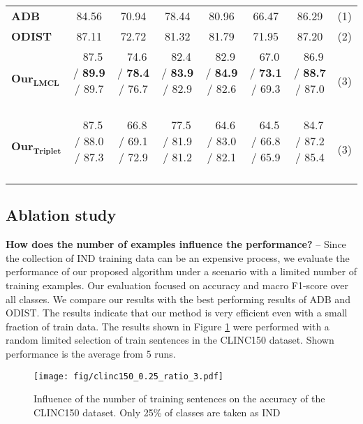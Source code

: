 \documentclass[runningheads]{llncs}
\begin{document}
\begin{table}[t]
\begin{adjustbox}{width=1\textwidth}
\begin{tabular}{l|cc|cc|cc|c}
\textbf{ADB}                & 84.56                & 70.94                & 78.44                & 80.96                & 66.47                & 86.29                & (1)  \\
\textbf{ODIST}              & 87.11                & 72.72                & 81.32       & 81.79                & 71.95       & 87.20                & (2)  \\ \hline
$\mathbf{Our}_\mathbf{LMCL}$    & \,\, 87.5 /  \textbf{89.9} /  89.7 \,\, & \,\, 74.6 /  \textbf{78.4} /  76.7 \,\, & \,\, 82.4 /  \textbf{83.9} /  82.9 \,\, & \,\, 82.9 /  \textbf{84.9} /  82.6 \,\, & \,\, 67.0 /  \textbf{73.1} /  69.3 \,\, & \,\, 86.9 /  \textbf{88.7} /  87.0 \,\, & (3)  \\
$\mathbf{Our}_\mathbf{Triplet}$ & \,\, 87.5 /  88.0 /  87.3 \,\, & \,\, 66.8 /  69.1 /  72.9 \,\, & \,\, 77.5 /  81.9 /  81.2 \,\, & \,\, 64.6 /  83.0 /  82.1 \,\, & \,\, 64.5 /  66.8 /  65.9 \,\, & \,\, 84.7 /  87.2 /  85.4 \,\, & (3) 
\end{tabular}
\end{adjustbox}

\end{table}

\subsection{Ablation study}

\textbf{How does the number of examples influence the performance?} -- Since the collection of IND training data can be an expensive process, we evaluate the performance of our proposed algorithm under a scenario with a limited number of training examples. Our evaluation focused on accuracy and macro F1-score over all classes. We compare our results with the best performing results of ADB and ODIST. The results indicate that our method is very efficient even with a small fraction of train data. The results shown in Figure \ref{fig:num_train_examples} were performed with a random limited selection of train sentences in the CLINC150 dataset. Shown performance is the average from 5 runs.

\begin{figure}[]
\centering
\texttt{[image: fig/clinc150\_0.25\_ratio\_3.pdf]}
\caption{Influence of the number of training sentences on the accuracy of the CLINC150 dataset. Only 25\% of classes are taken as IND}
\label{fig:num_train_examples}

\end{figure}
\end{document}
